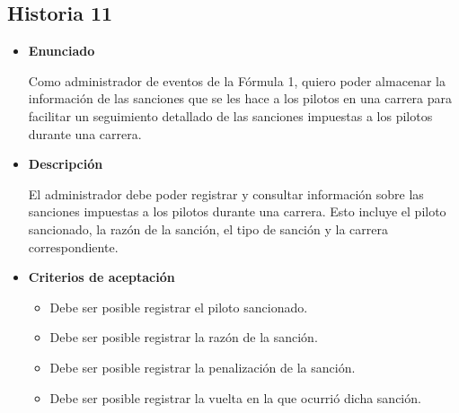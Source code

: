 \documentclass{article}
\begin{document}
	\subsection{Historia 11}
	\begin{itemize}
		
		\item \large{\textbf{Enunciado}}
		\begin{description}
			Como administrador de eventos de la Fórmula 1, quiero poder almacenar la información de las sanciones que se les hace a los pilotos en una carrera para facilitar un seguimiento detallado de las sanciones impuestas a los pilotos durante una carrera.
			
		\end{description}
		
		\item \large{\textbf{Descripción}}
		\begin{description}
			El administrador debe poder registrar y consultar información sobre las sanciones impuestas a los pilotos durante una carrera. Esto incluye el piloto sancionado, la razón de la sanción, el tipo de sanción y la carrera correspondiente. 
			
		\end{description}
		
		\item \large{\textbf{Criterios de aceptación}}
		\begin{itemize}
			\item Debe ser posible registrar el piloto sancionado.
			\item Debe ser posible registrar la razón de la sanción.
			\item Debe ser posible registrar la penalización de la sanción. 
			\item Debe ser posible registrar la vuelta en la que ocurrió dicha sanción.
			
		\end{itemize}
		
	\end{itemize}
	
\end{document}
